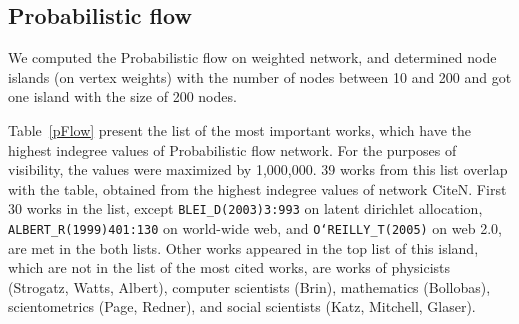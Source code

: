 \documentclass[11pt]{article} %
\begin{document}


\subsection{Probabilistic flow}

We computed the Probabilistic flow on weighted network, and determined node islands (on vertex weights) with the number of nodes between 10 and 200 and got one island with the size of 200 nodes. \medskip    

Table~\ref{pFlow} present the list of the  most important works, which have the highest indegree values of Probabilistic flow network. For the purposes of visibility, the values were maximized by 1,000,000. 39 works from this list overlap with the table, obtained from the highest indegree values of network CiteN. First 30 works in the list, except \texttt{BLEI\_D(2003)3:993} on  latent dirichlet allocation, \texttt{ALBERT\_R(1999)401:130} on world-wide web, and \texttt{O`REILLY\_T(2005)} on web 2.0, are met in the both lists. Other works appeared in the top list of this island, which are not in the list of the most cited works, are works of physicists (Strogatz, Watts, Albert), computer scientists (Brin), mathematics (Bollobas), scientometrics (Page, Redner), and social scientists (Katz, Mitchell, Glaser). 
\end{document}

